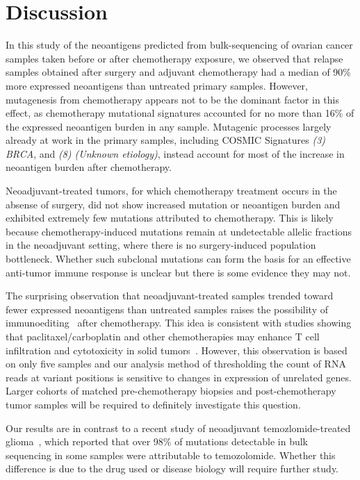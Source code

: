 \section*{Discussion}
In this study of the neoantigens predicted from bulk-sequencing of ovarian cancer samples taken before or after chemotherapy exposure, we observed that relapse samples obtained after surgery and adjuvant chemotherapy had a median of 90\% more expressed neoantigens than untreated primary samples. However, mutagenesis from chemotherapy appears not to be the dominant factor in this effect, as chemotherapy mutational signatures accounted for no more than 16\% of the expressed neoantigen burden in any sample. Mutagenic processes largely already at work in the primary samples, including COSMIC Signatures \textit{(3) BRCA}, and \textit{(8) (Unknown etiology)}, instead account for most of the increase in neoantigen burden after chemotherapy. 

Neoadjuvant-treated tumors, for which chemotherapy treatment occurs in the absense of surgery, did not show increased mutation or neoantigen burden and exhibited extremely few mutations attributed to chemotherapy. This is likely because chemotherapy-induced mutations remain at undetectable allelic fractions in the neoadjuvant setting, where there is no surgery-induced population bottleneck. Whether such subclonal mutations can form the basis for an effective anti-tumor immune response is unclear but there is some evidence they may not\cite{McGranahan_2016}.

The surprising observation that neoadjuvant-treated samples trended toward fewer expressed neoantigens than untreated samples raises the possibility of immunoediting~\cite{Dunn_2002} after chemotherapy. This idea is consistent with studies showing that paclitaxel/carboplatin and other chemotherapies may enhance T cell infiltration and cytotoxicity in solid tumors~\cite{Demaria2001,Wu_2009,Pfannenstiel_2010,Hodge_2013}. However, this observation is based on only five samples and our analysis method of thresholding the count of RNA reads at variant positions is sensitive to changes in expression of unrelated genes. Larger cohorts of matched pre-chemotherapy biopsies and post-chemotherapy tumor samples will be required to definitely investigate this question.

Our results are in contrast to a recent study of neoadjuvant temozlomide-treated glioma~\cite{Johnson_2013}, which reported that over 98\% of mutations detectable in bulk sequencing in some samples were attributable to temozolomide. Whether this difference is due to the drug used or disease biology will require further study.

